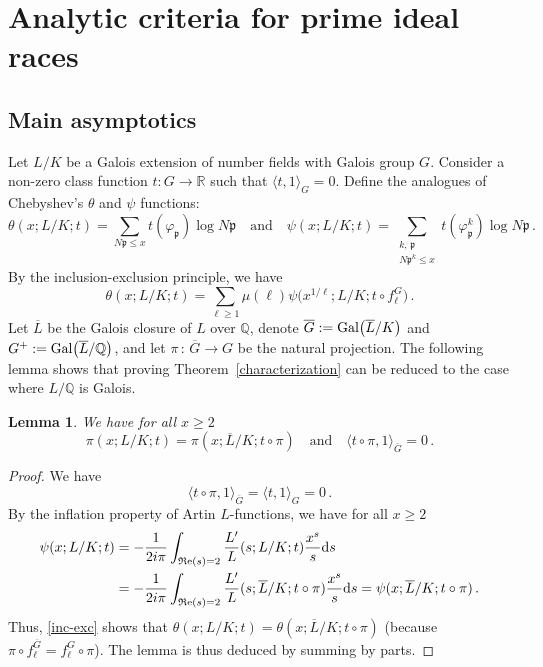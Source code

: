 \documentclass[12pt]{amsart}
\numberwithin{equation}{section}
\newcommand{\Gal}{{\rm Gal}}
\newcommand{\Q}{\mathbb Q}
\newcommand{\R}{\mathbb R}
\renewcommand{\Re}{{\mathfrak R}{\rm e}}
\newtheorem{lem}[X]{Lemma}
\theoremstyle{definition}
\theoremstyle{remark}
\begin{document}
\section{Analytic criteria for prime ideal races}\label{Induction}
\subsection{Main asymptotics}
Let $L/K$ be a Galois extension of number fields with Galois group $G$. Consider a non-zero class function $t: G \to \R$ such that $\langle t, 1 \rangle_G = 0$. 
Define the analogues of Chebyshev's $\theta$ and $\psi$ functions: 
\begin{equation}\label{theta-psi}
    \theta(x;L/K;t)=\sum_{N\mathfrak{p}\le x}t(\varphi_\mathfrak{p})\log N\mathfrak{p}\quad\text{and}\quad \psi(x;L/K;t)=\sum_{\substack{k,\,\mathfrak{p}\\ N\mathfrak{p}^k\le x}}t(\varphi_\mathfrak{p}^k)\log N\mathfrak{p}\, .
\end{equation}
 By the inclusion-exclusion principle, we have \begin{equation}\label{inc-exc}
    \theta(x;L/K;t)=\sum_{\ell\ge 1}\mu (\ell)\psi\bigl(x^{1/\ell};L/K; t\circ f_\ell^G\bigr)\, .
\end{equation}
Let $\overline{L}$ be the Galois closure of $L$ over $\Q$, denote $\overline{G}:=\Gal\bigl(\overline{L}/K\bigr)$ and $G^+:=\Gal\bigl(\overline{L}/\Q\bigr)$, and let $\pi\, \colon\,  \overline{G}\to G $ be the natural projection. 
The following lemma shows that proving Theorem~\ref{characterization} can be reduced to the case where $L/\Q$ is Galois.
\begin{lem}\label{GaloiscaseReduction}
    We have for all $x\ge 2$
    \[\pi(x;L/K;t)=\pi(x;\overline{L}/K;t\circ \pi )\quad \text{and}\quad \langle t\circ \pi, 1\rangle_{\overline{G}}=0\, .\]
\end{lem}
\begin{proof}
   We have \[ \langle t\circ \pi, 1\rangle_{\overline{G}}=\langle t, 1\rangle_G=0\, .\]
    By the inflation property of Artin $L$-functions, we have for all $x\ge 2$
    \begin{align*}
        \psi(x;L/K;t)&=-\frac{1}{2i\pi}\int_{\Re(s)=2}\frac{L'}{L}(s;L/K;t)\frac{x^s}{s}\mathrm{d}s\\
        &=-\frac{1}{2i\pi}\int_{\Re(s)=2}\frac{L'}{L}(s;\overline{L}/K;t\circ \pi)\frac{x^s}{s}\mathrm{d}s=\psi(x;\overline{L}/K;t\circ\pi)\, .
    \end{align*}
    Thus, \eqref{inc-exc} shows that $\theta(x;L/K;t)=\theta(x;\overline{L}/K;t\circ \pi)$ (because $\pi\circ f^{\overline{G}}_\ell=f_\ell^G\circ \pi$). The lemma is thus deduced by summing by parts.
\end{proof}
\end{document}
